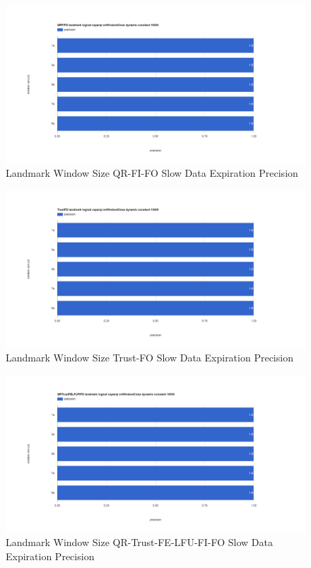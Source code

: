 \begin{figure}[!htbp]
    \centering
    \includegraphics[width=\textwidth]{img/app3-land-ws-qrfifo-slow-p.png}
    \caption{Landmark Window Size QR-FI-FO Slow Data Expiration Precision}
\end{figure}
\begin{figure}[!htbp]
    \centering
    \includegraphics[width=\textwidth]{img/app3-land-ws-trustfo-slow-p.png}
    \caption{Landmark Window Size Trust-FO Slow Data Expiration Precision}
\end{figure}
\begin{figure}[!htbp]
    \centering
    \includegraphics[width=\textwidth]{img/app3-land-ws-qrtrustfelfufifo-slow-p.png}
    \caption{Landmark Window Size QR-Trust-FE-LFU-FI-FO Slow Data Expiration Precision}
\end{figure}

